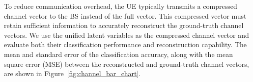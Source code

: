 \vspace{-0.09in}
To reduce communication overhead, the \MakeUppercase{ue} typically transmits a compressed channel vector to the \MakeUppercase{bs} instead of the full vector. This compressed vector must retain sufficient information to accurately reconstruct the ground-truth channel vectors. %
We use the unified latent variables as the compressed channel vector and evaluate both their classification performance and reconstruction capability. The mean and standard error of the classification accuracy, along with the mean square error (\MakeUppercase{mse}) between the reconstructed and ground-truth channel vectors, are shown in Figure~\ref{fig:channel_bar_chart}. 









